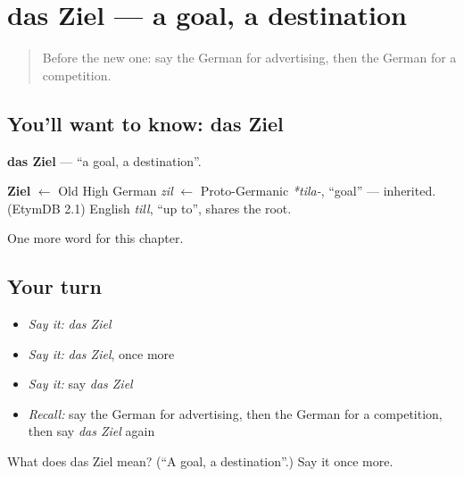 \section[das Ziel]{das Ziel — a goal, a destination}

\label{lesson:GE-C243-ziel}



\begin{quote}
Before the new one: say the German for advertising, then the German for a competition.
\end{quote}

\subsection*{You'll want to know: das Ziel}
\textbf{das Ziel} — \textquotedblleft{}a goal, a destination\textquotedblright{}.

\begin{cousinweb}
\textbf{Ziel} $\leftarrow$ Old High German \emph{zil} $\leftarrow$ Proto-Germanic \emph{*tila-}, \textquotedblleft{}goal\textquotedblright{} — inherited. (EtymDB 2.1) English \emph{till}, \textquotedblleft{}up to\textquotedblright{}, shares the root.
\end{cousinweb}

\begin{grammarlens}[title={What you've built}]
One more word for this chapter.
\end{grammarlens}

\subsection*{Your turn}
\begin{itemize}
\raggedright
  \item \emph{Say it:} \emph{das Ziel}
  \item \emph{Say it:} \emph{das Ziel}, once more
  \item \emph{Say it:} say \emph{das Ziel}
  \item \emph{Recall:} say the German for advertising, then the German for a competition, then say \emph{das Ziel} again
\end{itemize}

\begin{tcolorbox}[breakable,colback=teal!4,colframe=teal!35!black,title={Before you move on}]
What does das Ziel mean? (\textquotedblleft{}A goal, a destination\textquotedblright{}.) Say it once more.
\end{tcolorbox}
